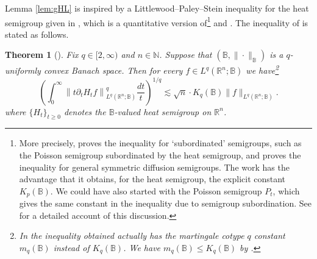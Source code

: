 \documentclass[11pt,reqno]{amsart}
\newtheorem{theorem}{Theorem}
\newcommand{\1}{\mathbf 1}
\newcommand{\R}{\mathbb{R}}
\newcommand{\Norm}[2]{\|#1\|_{#2}}
\begin{document}
Lemma \ref{lem:gHL} is inspired by a Littlewood--Paley--Stein inequality for the heat semigroup given in \cite[Theorem 17]{hytonen2019heat}, which is a quantitative version of\footnote{More precisely, \cite{martinez2006vector} proves the inequality for `subordinated' semigroups, such as the Poisson semigroup subordinated by the heat semigroup, and \cite{xu2020vector} proves the inequality for general symmetric diffusion semigroups. The work \cite{hytonen2019heat} has the advantage that it obtains, for the heat semigroup, the explicit constant $K_p\left(\mathbb{B}\right)$. We could have also started with the Poisson semigroup $P_t$, which gives the same constant in the inequality due to semigroup subordination. See \cite[Appendix A]{naor2022foliated} for a detailed account of this discussion.} \cite[Theorem 2.1]{martinez2006vector} and \cite[Theorem 2]{xu2020vector}. The inequality of \cite[Theorem 17]{hytonen2019heat} is stated as follows.

\begin{theorem}[{\cite[Theorem 17]{hytonen2019heat}}] Fix $q\in [2,\infty)$ and $n\in \mathbb{N}$. Suppose that $(\mathbb{B},\|\cdot\|_\mathbb{B})$ is a $q$-uniformly convex Banach space. Then for every $f\in L^q(\mathbb{R}^n;\mathbb{B})$ we have\footnote{In \cite{hytonen2019heat} the inequality obtained actually has the martingale cotype $q$ constant $m_q(\mathbb{B})$ instead of $K_q(\mathbb{B})$. We have $m_q(\mathbb{B})\le K_q(\mathbb{B})$ by \cite{pisier1975martingales}.}
	\begin{equation*}
		\left(\int_0^\infty\left\|t\partial_t H_t f\right\|_{L^q\left(\R^n;\mathbb{B}\right)}^q\frac{d t}{t}\right)^{1/q}
		\lesssim\sqrt{n}\cdot K_q(\mathbb{B})\Norm{f}{L^q(\R^n;\mathbb{B})}.
	\end{equation*}
	where $\{H_t\}_{t\ge 0}$ denotes the $\mathbb{B}$-valued heat semigroup on $\mathbb{R}^n$.
\end{theorem}

\end{document}
